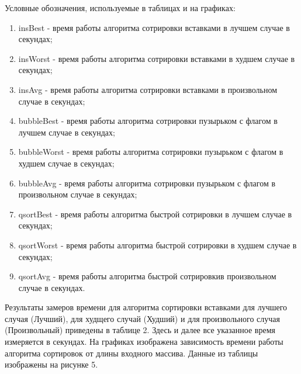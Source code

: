 \documentclass[a4paper,14pt]{report}
\begin{document}
Условные обозначения, используемые в таблицах и на графиках:
\begin{enumerate}
	\item insBest - время работы алгоритма сотрировки вставками в лучшем случае в секундах;
	\item insWorst - время работы алгоритма сотрировки вставками в худшем случае в секундах;
	\item insAvg - время работы алгоритма сотрировки вставками в произвольном случае в секундах;
	\item bubbleBest - время работы алгоритма сотрировки пузырьком с флагом в лучшем случае в секундах;
	\item bubbleWorst - время работы алгоритма сотрировки пузырьком с флагом в худшем случае в секундах;
	\item bubbleAvg - время работы алгоритма сотрировки пузырьком с флагом в произвольном случае в секундах;
	\item qsortBest - время работы алгоритма быстрой сотрировки в лучшем случае в секундах;
	\item qsortWorst - время работы алгоритма быстрой сотрировки в худшем случае в секундах;
	\item qsortAvg - время работы алгоритма быстрой сотрировкив произвольном случае в секундах.
\end{enumerate}


Результаты замеров времени для алгоритма сортировки вставками для лучшего случая (Лучший), для худщего случай (Худший) и для произвольного случая (Произвольный) приведены в таблице 2. Здесь и далее все указанное время измеряется в секундах. На графиках изображена зависимость времени работы алгоритма сортировок от длины входного массива.
Данные из таблицы изображены на рисунке 5.
\end{document}

